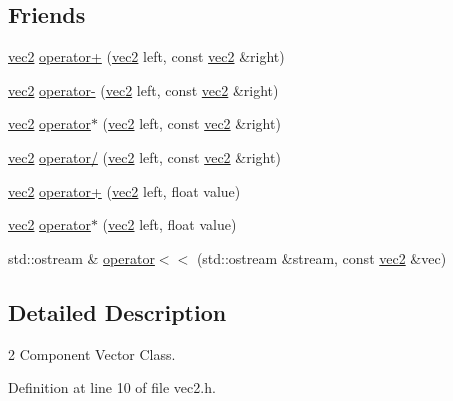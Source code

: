 \subsection*{Friends}
\begin{DoxyCompactItemize}
\item 
\hyperlink{structspork_1_1maths_1_1vec2}{vec2} \hyperlink{structspork_1_1maths_1_1vec2_acbbd9fb82f40deeca3b6fbfcdb3baa30}{operator+} (\hyperlink{structspork_1_1maths_1_1vec2}{vec2} left, const \hyperlink{structspork_1_1maths_1_1vec2}{vec2} \&right)
\item 
\hyperlink{structspork_1_1maths_1_1vec2}{vec2} \hyperlink{structspork_1_1maths_1_1vec2_adfffcea694a076d10b3b734c0c149062}{operator-\/} (\hyperlink{structspork_1_1maths_1_1vec2}{vec2} left, const \hyperlink{structspork_1_1maths_1_1vec2}{vec2} \&right)
\item 
\hyperlink{structspork_1_1maths_1_1vec2}{vec2} \hyperlink{structspork_1_1maths_1_1vec2_a54f52eaceb5eb993f9d3960e55b866a7}{operator$\ast$} (\hyperlink{structspork_1_1maths_1_1vec2}{vec2} left, const \hyperlink{structspork_1_1maths_1_1vec2}{vec2} \&right)
\item 
\hyperlink{structspork_1_1maths_1_1vec2}{vec2} \hyperlink{structspork_1_1maths_1_1vec2_a73f8d7dee179a44d9f7e23c167467088}{operator/} (\hyperlink{structspork_1_1maths_1_1vec2}{vec2} left, const \hyperlink{structspork_1_1maths_1_1vec2}{vec2} \&right)
\item 
\hyperlink{structspork_1_1maths_1_1vec2}{vec2} \hyperlink{structspork_1_1maths_1_1vec2_a3d4ae35159743901d7038535e3b26bb5}{operator+} (\hyperlink{structspork_1_1maths_1_1vec2}{vec2} left, float value)
\item 
\hyperlink{structspork_1_1maths_1_1vec2}{vec2} \hyperlink{structspork_1_1maths_1_1vec2_a071dd3c272a3381ff2970f5f8770ad62}{operator$\ast$} (\hyperlink{structspork_1_1maths_1_1vec2}{vec2} left, float value)
\item 
std\+::ostream \& \hyperlink{structspork_1_1maths_1_1vec2_aad9cd30e354cce297fed94cf69a1c0d7}{operator$<$$<$} (std\+::ostream \&stream, const \hyperlink{structspork_1_1maths_1_1vec2}{vec2} \&vec)
\end{DoxyCompactItemize}


\subsection{Detailed Description}
2 Component Vector Class. 

Definition at line 10 of file vec2.\+h.



